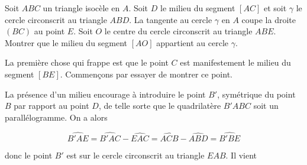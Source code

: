 \begin{exo}
Soit $ABC$ un triangle isocèle en $A$. Soit $D$ le milieu du segment $[AC]$ et soit $\gamma$ le cercle circonscrit au triangle $ABD$. La tangente au cercle $\gamma$ en $A$ coupe la droite $(BC)$ au point $E$. Soit $O$ le centre du cercle circonscrit au triangle $ABE$. Montrer que le milieu du segment $[AO]$ appartient au cercle $\gamma$. 
\end{exo}
\begin{sol}
%
%
%

La première chose qui frappe est que le point $C$ est manifestement le milieu du segment $[BE]$. Commençons par essayer de montrer ce point. 

La présence d'un milieu encourage à introduire le point $B'$, symétrique du point $B$ par rapport au point $D$, de telle sorte que le quadrilatère $B'ABC$ soit un parallélogramme. On a alors 

\[\widehat{B'AE}= \widehat{B'AC}-\widehat{EAC}=\widehat{ACB}-\widehat{ABD}=\widehat{B'BE}\]

donc le point $B'$ est sur le cercle circonscrit au triangle $EAB$. Il vient 


\end{sol}

